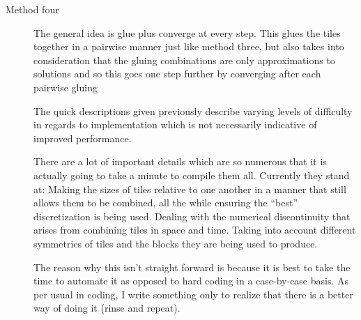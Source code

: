 \begin{description}
{\begin{description}
\item[Method four]
The general idea is glue plus converge at every step.
This glues the tiles together in a pairwise manner just
like method three, but also takes into consideration
that the gluing combinations are only approximations
to solutions and so this goes one step further by converging
after each pairwise gluing

The quick descriptions given previously describe varying levels
of difficulty in regards to implementation
which is not necessarily indicative of improved performance.

There are a lot of important details which are so numerous
that it is actually going to take a minute to compile them all.
Currently they stand at: Making the sizes of tiles relative
to one another in a manner that still allows them to be
combined, all the while ensuring the ``best'' discretization
is being used. Dealing with the numerical discontinuity
that arises from combining tiles in space and time. Taking
into account different symmetries of tiles and the blocks
they are being used to produce.

The reason why this isn't straight forward is because
it is best to take the time to automate it as opposed
to hard coding in a case-by-case basis. As per usual
in coding, I write something only to realize that there is a
better way of doing it (rinse and repeat).
\end{description}
}

\end{description}
